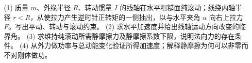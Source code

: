 (1) 质量 \(m\)、外缘半径 \(R\)、转动惯量 \(I\) 的线轴在水平粗糙面纯滚动；线绕内轴半径 \(r<R\)，从使拉力产生逆时针正转矩的一侧抽出，以与水平夹角 \(\alpha\) 向右上拉力 \(F\)。写出平动、转动与滚动约束。
(2) 求水平加速度并给出线轴运动方向改变的临界角。
(3) 求维持纯滚动所需静摩擦力及静摩擦系数下限，说明法向力的存在条件。
(4) 从外力做功率与总动能变化验证所得加速度；解释静摩擦为何可以非零而不对刚体做功。
